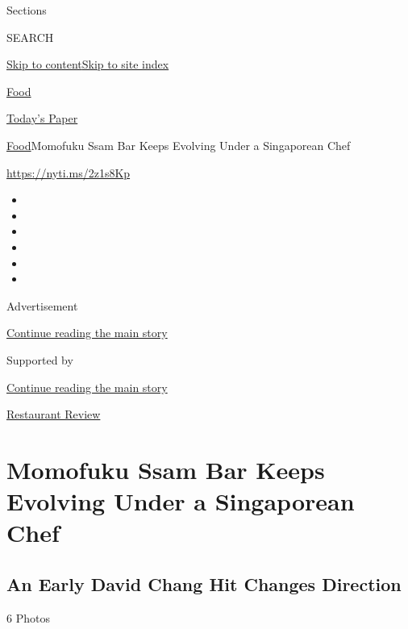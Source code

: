 Sections

SEARCH

\protect\hyperlink{site-content}{Skip to
content}\protect\hyperlink{site-index}{Skip to site index}

\href{https://www.nytimes3xbfgragh.onion/section/food}{Food}

\href{https://myaccount.nytimes3xbfgragh.onion/auth/login?response_type=cookie\&client_id=vi}{}

\href{https://www.nytimes3xbfgragh.onion/section/todayspaper}{Today's
Paper}

\href{/section/food}{Food}\textbar{}Momofuku Ssam Bar Keeps Evolving
Under a Singaporean Chef

\url{https://nyti.ms/2z1s8Kp}

\begin{itemize}
\item
\item
\item
\item
\item
\item
\end{itemize}

Advertisement

\protect\hyperlink{after-top}{Continue reading the main story}

Supported by

\protect\hyperlink{after-sponsor}{Continue reading the main story}

\href{/column/restaurant-review}{Restaurant Review}

\hypertarget{momofuku-ssam-bar-keeps-evolving-under-a-singaporean-chef}{%
\section{Momofuku Ssam Bar Keeps Evolving Under a Singaporean
Chef}\label{momofuku-ssam-bar-keeps-evolving-under-a-singaporean-chef}}

\href{https://www.nytimes3xbfgragh.onion/slideshow/2017/10/31/dining/momofuku-ssam-bar-nyc.html}{}

\hypertarget{an-early-david-chang-hit-changes-direction}{%
\subsection{An Early David Chang Hit Changes
Direction}\label{an-early-david-chang-hit-changes-direction}}

6 Photos

